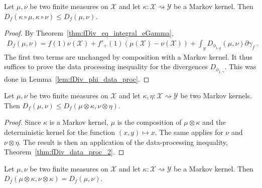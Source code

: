 \begin{theorem}
  \label{thm:fDiv_data_proc_2}
  \leanok
  Let $\mu, \nu$ be two finite measures on $\mathcal X$ and let $\kappa : \mathcal X \rightsquigarrow \mathcal Y$ be a Markov kernel.
  Then $D_f(\kappa \circ \mu, \kappa \circ \nu) \le D_f(\mu, \nu)$.
\end{theorem}

\begin{proof}\leanok
{}
By Theorem~\ref{thm:fDiv_eq_integral_eGamma},
\begin{align*}
D_f(\mu, \nu) = f(1) \nu(\mathcal X) + f'_+(1) (\mu(\mathcal X) - \nu (\mathcal X)) + \int_y D_{\phi_{1,y}}(\mu, \nu) \partial\gamma_f \: .
\end{align*}
The first two terms are unchanged by composition with a Markov kernel. It thus suffices to prove the data processing inequality for the divergences $D_{\phi_{1, \gamma}}$. This was done in Lemma~\ref{lem:fDiv_phi_data_proc}.
\end{proof}


\begin{theorem}
  \label{thm:fDiv_le_compProd_2}
  \leanok
  Let $\mu, \nu$ be two finite measures on $\mathcal X$ and let $\kappa, \eta : \mathcal X \rightsquigarrow \mathcal Y$ be two Markov kernels.
  Then $D_f(\mu, \nu) \le D_f(\mu \otimes \kappa, \nu \otimes \eta)$.
\end{theorem}

\begin{proof}\leanok
{}
Since $\kappa$ is a Markov kernel, $\mu$ is the composition of $\mu \otimes \kappa$ and the deterministic kernel for the function $(x,y) \mapsto x$. The same applies for $\nu$ and $\nu \otimes \eta$.
The result is then an application of the data-processing inequality, Theorem~\ref{thm:fDiv_data_proc_2}.
\end{proof}


\begin{lemma}
  \label{thm:fDiv_compProd_right_2}
  \leanok
  Let $\mu, \nu$ be two finite measures on $\mathcal X$ and let $\kappa : \mathcal X \rightsquigarrow \mathcal Y$ be a Markov kernel.
  Then $D_f(\mu \otimes \kappa, \nu \otimes \kappa) = D_f(\mu, \nu)$.
\end{lemma}

